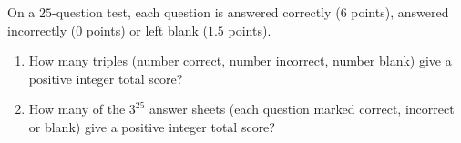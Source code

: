 On a $25$-question test, each question is answered correctly ($6$ points), answered incorrectly ($0$ points) or left blank ($1.5$ points).
\begin{enumerate}
\item[(a)] How many triples (number correct, number incorrect, number blank) give a positive integer total score?
\item[(b)] How many of the $3^{25}$ answer sheets (each question marked correct, incorrect or blank) give a positive integer total score?
\end{enumerate}
